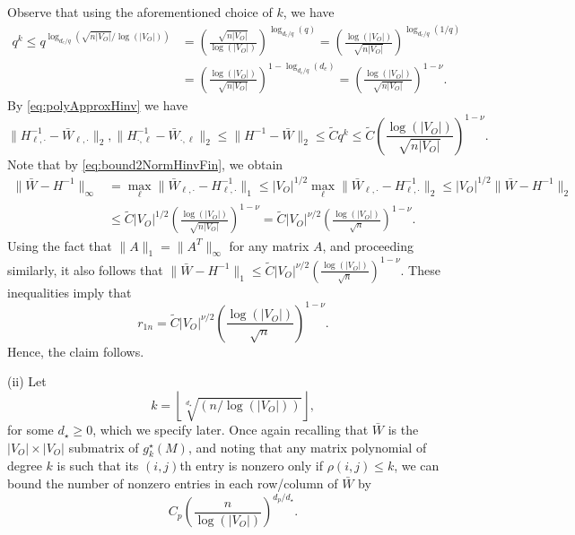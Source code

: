 \documentclass[opre,nonblindrev]{informs3} %
\newcommand{\rowdot}{\cdot}
\begin{document}
\begin{APPENDIX}{}
Observe that
using the aforementioned choice of $k$, we have
\begin{equation*}
\begin{aligned}
q^k \leq
q^{\log_{d_e/q}(\sqrt{ n|V_O|}/\log(|V_O|)) }
&=
\left( \frac{ \sqrt{n|V_O|}}{\log(|V_O|)} \right)^{\log_{d_e/q}(q)}
=
\left( \frac{\log(|V_O|)}{ \sqrt{n|V_O|}} \right)^{\log_{d_e/q}(1/q)}\\
& =
\left( \frac{\log(|V_O|)}{ \sqrt{n|V_O|}} \right)^{1-\log_{d_e/q}(d_e)}
=
\left( \frac{\log(|V_O|)}{ \sqrt{n|V_O|}} \right)^{1-\nu}.
\end{aligned}
\end{equation*}
By \eqref{eq:polyApproxHinv}
we have
\begin{equation}\label{eq:bound2NormHinvFin}
\| H^{-1}_{\ell ,\rowdot}-\bar{W}_{\ell,\rowdot} \|_2,
\| H^{-1}_{\rowdot,\ell}-\bar{W}_{\rowdot,\ell} \|_2
\leq  \|
H^{-1} - \bar{W}\|_2
\leq
\tilde{C}
q^k
\leq
\tilde{C}
\left( \frac{\log(|V_O|)}{ \sqrt{n|V_O|}} \right)^{1-\nu}.
\end{equation}
Note that by \eqref{eq:bound2NormHinvFin}, we obtain
\begin{equation}\label{eq:boundWHinv}
\begin{aligned}
\| \bar{W}  - H^{-1}\|_\infty
&= \max_\ell \| \bar{W}_{\ell ,\rowdot}  - H_{\ell ,\rowdot}^{-1}\|_1
\leq  {|V_O|}^{1/2}\max_\ell \| \bar{W}_{\ell ,\rowdot}  - H_{\ell ,\rowdot}^{-1}\|_2
\leq  {|V_O|}^{1/2} \| \bar{W}  - H^{-1}\|_2\\
&\leq \tilde{C} {|V_O|}^{1/2}
\left( \frac{\log(|V_O|)}{ \sqrt{n|V_O|}} \right)^{1-\nu}
=
\tilde{C}
{|V_O|}^{\nu/2}
\left( \frac{\log(|V_O|)}{\sqrt{n} } \right)^{1-\nu}
.
\end{aligned}
\end{equation}
Using the fact that $\|A\|_1=\|A^T\|_\infty$ for any matrix $A$, and
proceeding similarly, it also follows that
$\| \bar{W}  - H^{-1}\|_1 \leq  \tilde{C}
{|V_O|}^{\nu/2}
\left( \frac{\log(|V_O|)}{\sqrt{n} } \right)^{1-\nu}$.  
These  inequalities  imply that
$$r_{1n}=
\tilde{C}{|V_O|}^{\nu/2}
\left( \frac{\log(|V_O|)}{\sqrt{n} } \right)^{1-\nu}
.$$
Hence, the claim follows.



(ii)
Let
\[
k =
\left\lfloor
\sqrt[d_\star]{ {(n/\log(|V_O|))} }
\right\rfloor,
\]
for some $d_\star \geq 0$, which we specify later.
Once again recalling that
$\bar W$ is the $|V_O| \times |V_O|$ submatrix
of $g^\star_k(M)$, and noting that  any matrix polynomial of degree $k$ is such that its $(i,j)$th entry is nonzero only if $\rho(i,j)\leq k$, we can bound the  number of nonzero entries in each row/column
of $\bar W$  by
\[
C_p \left(\frac{n}{\log(|V_O|)} \right)^{d_p/d_\star}
.
\]
 


\end{APPENDIX}
\end{document}
